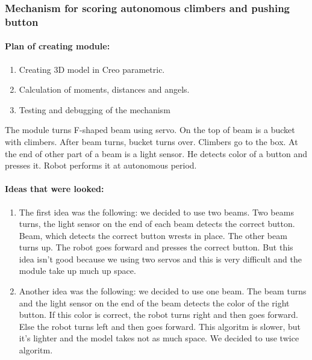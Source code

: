 \subsubsection{Mechanism for scoring autonomous climbers and pushing button}
\paragraph{Plan of creating module:}	
	
	\begin{enumerate}
		\item Creating 3D model in Creo parametric.
		\item Calculation of moments, distances and angels.
		\item Testing and debugging of the mechanism
	\end{enumerate}
	
	The module turns F-shaped beam using servo. On the top of beam is a bucket with climbers. After beam turns, bucket turns over. Climbers go to the box. At the end of other part of a beam is a light sensor. He detects color of a button and presses it. Robot performs it at autonomous period. \newline
	
	\paragraph{Ideas that were looked:}
	
	\begin{enumerate}	
		\item The first idea was the following: we decided to use two beams. Two beams turns, the light sensor on the end of each beam detects the correct button. Beam, which detects the correct button wrests in place. The other beam turns up. The robot goes forward and presses the correct button. But this idea isn't good because we using two servos and this is very difficult and the module take up much up space.
	
		\item Another idea was the following: we decided to use one beam. The beam turns and the light sensor on the end of the beam detects the color of the right button. If this color is correct, the robot turns right and then goes forward. Else the robot turns left and then goes forward. This algoritm is slower, but it's lighter and the model takes not as much space. We decided to use twice algoritm.
	\end{enumerate}
	

